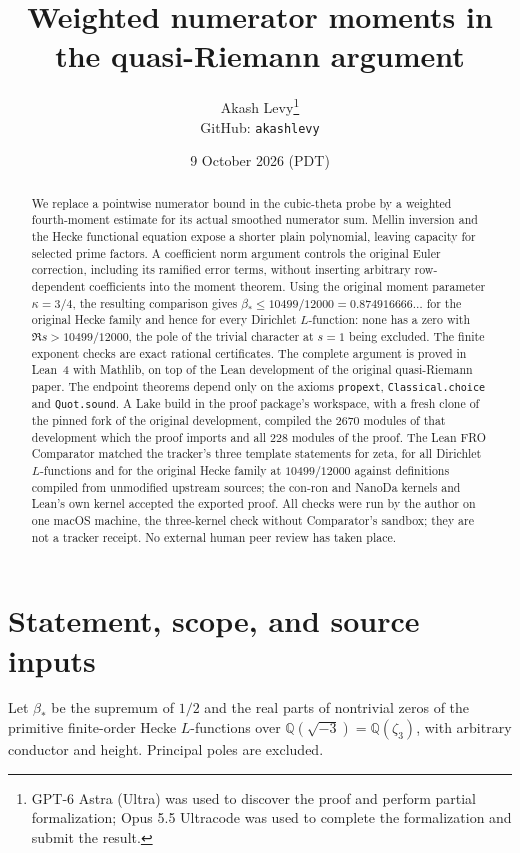 \documentclass[11pt]{article}
\title{Weighted numerator moments in the quasi-Riemann argument}
\author{Akash Levy\thanks{GPT-6 Astra (Ultra) was used to discover the
proof and perform partial formalization; Opus 5.5 Ultracode was used to
complete the formalization and submit the result.}\\[2pt]
{\normalsize GitHub: \texttt{akashlevy}}}
\date{9 October 2026 (PDT)}
\newcommand{\Bstar}{\beta_*}
\newcommand{\F}{\mathbb Q(\sqrt{-3})}
\begin{document}
\maketitle

\begin{abstract}
We replace a pointwise numerator bound in the cubic-theta probe by a
weighted fourth-moment estimate for its actual smoothed numerator sum.
Mellin inversion and the Hecke functional equation expose a shorter plain
polynomial, leaving capacity for selected prime factors. A coefficient
norm argument controls the original Euler correction, including its
ramified error terms, without inserting arbitrary row-dependent
coefficients into the moment theorem. Using the original moment parameter
$\kappa=3/4$, the resulting comparison gives
$\beta_*\le10499/12000=0.874916666\ldots$ for the original Hecke family
and hence for every Dirichlet $L$-function: none has a zero with
$\Re s>10499/12000$, the pole of the trivial character at $s=1$ being
excluded. The finite exponent checks are exact rational certificates.
The complete argument is proved in Lean~4 with Mathlib, on top of the
Lean development of the original quasi-Riemann paper. The endpoint
theorems depend only on the axioms \texttt{propext},
\texttt{Classical.choice} and \texttt{Quot.sound}. A Lake build in the
proof package's workspace, with a fresh clone of the pinned fork of the
original development, compiled the 2670 modules of that development
which the proof imports and all 228 modules of the proof. The Lean FRO
Comparator matched the tracker's three template statements for zeta,
for all Dirichlet $L$-functions and for the original Hecke family at
$10499/12000$ against definitions compiled from unmodified upstream
sources; the con-ron and NanoDa kernels and Lean's own kernel accepted
the exported proof. All checks were run by the author on one macOS machine,
the three-kernel check without Comparator's sandbox; they are not a
tracker receipt. No external human peer review has taken place.
\end{abstract}

\section{Statement, scope, and source inputs}

Let $\Bstar$ be the supremum of $1/2$ and the real parts of nontrivial
zeros of the primitive finite-order Hecke $L$-functions over
$\F=\mathbb Q(\zeta_3)$, with arbitrary conductor and height. Principal
poles are excluded.
\end{document}
